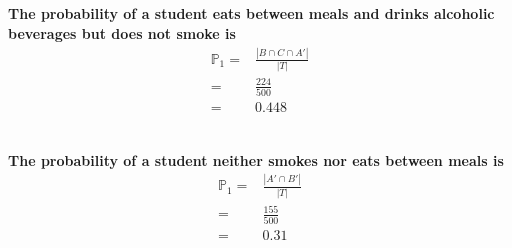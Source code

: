 \documentclass{article}
\begin{document}
        \subsection{}
            \paragraph{
                The probability of a student eats between meals and drinks alcoholic beverages but does not smoke is 
                \begin{equation*}
                    \begin{split}
                        \mathbb{P}_1=&\frac{|B\cap C\cap A'|}{|T|}\\
                            =&\frac{224}{500}\\
                            =&0.448\\
                    \end{split}
                \end{equation*} 
            }
        \subsection{}
            \paragraph{
                The probability of a student neither smokes nor eats between meals is 
                \begin{equation*}
                    \begin{split}
                        \mathbb{P}_1=&\frac{|A'\cap B'|}{|T|}\\
                            =&\frac{155}{500}\\
                            =&0.31
                            \\
                    \end{split}
                \end{equation*} 
            }
\end{document}
